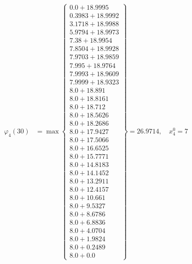 \documentclass{article}
\begin{document}
\begin{align*}
  
\varphi_{4}(30) &= \max \left\{ \begin{array}{c}
0.0 + 18.9995 \\
 0.3983 + 18.9992 \\
 3.1718 + 18.9988 \\
 5.9794 + 18.9973 \\
 7.38 + 18.9954 \\
 7.8504 + 18.9928 \\
 7.9703 + 18.9859 \\
 7.995 + 18.9764 \\
 7.9993 + 18.9609 \\
 7.9999 + 18.9323 \\
 8.0 + 18.891 \\
 8.0 + 18.8161 \\
 8.0 + 18.712 \\
 8.0 + 18.5626 \\
 8.0 + 18.2686 \\
 8.0 + 17.9427 \\
 8.0 + 17.5066 \\
 8.0 + 16.6525 \\
 8.0 + 15.7771 \\
 8.0 + 14.8183 \\
 8.0 + 14.1452 \\
 8.0 + 13.2911 \\
 8.0 + 12.4157 \\
 8.0 + 10.661 \\
 8.0 + 9.5327 \\
 8.0 + 8.6786 \\
 8.0 + 6.8836 \\
 8.0 + 4.0704 \\
 8.0 + 1.9824 \\
 8.0 + 0.2489 \\
 8.0 + 0.0
\end{array} \right\}=26.9714,\quad x_{4}^0=7\\
  
  
  

\end{align*}
\end{document}
